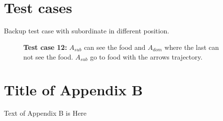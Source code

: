 \documentclass{article}
\begin{document}
\section{\\Test cases}\label{test.cases}
Backup test case with subordinate in different position.
\begin{figure}
    \centering
    \caption{\textbf {Test  case 12:} \(A_{sub}\) can see the food and \(A_{dom}\) where the last can not see the food. \(A_{sub}\) go to food with the arrows trajectory.}
    \label{fig.tc.12}
\end{figure}
\section{Title of Appendix B}

Text of Appendix B is Here
\end{document}
